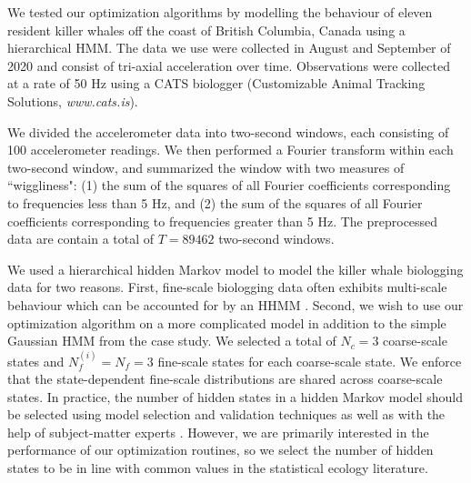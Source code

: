 
We tested our optimization algorithms by modelling the behaviour of eleven resident killer whales off the coast of British Columbia, Canada using a hierarchical HMM. The data we use were collected in August and September of 2020 and consist of tri-axial acceleration over time. Observations were collected at a rate of 50 Hz using a CATS biologger (Customizable Animal Tracking Solutions, {\em{www.cats.is}}).


We divided the accelerometer data into two-second windows, each consisting of 100 accelerometer readings. We then performed a Fourier transform within each two-second window, and summarized the window with two measures of ``wiggliness":
(1) the sum of the squares of all Fourier coefficients corresponding to frequencies less than 5 Hz, and (2) the sum of the squares of all Fourier coefficients corresponding to frequencies greater than 5 Hz. The preprocessed data are contain a total of $T=89462$ two-second windows.

We used a hierarchical hidden Markov model \citep{Barajas:2017} to model the killer whale biologging data for two reasons. First, fine-scale biologging data often exhibits multi-scale behaviour which can be accounted for by an HHMM \citep{Sidrow:2021}. Second, we wish to use our optimization algorithm on a more complicated model in addition to the simple Gaussian HMM from the case study. We selected a total of $N_c = 3$ coarse-scale states and $N_f^{(i)} = N_f = 3$ fine-scale states for each coarse-scale state. We enforce that the state-dependent fine-scale distributions are shared across coarse-scale states. In practice, the number of hidden states in a hidden Markov model should be selected using model selection and validation techniques as well as with the help of subject-matter experts \citep{Pohle:2017}. However, we are primarily interested in the performance of our optimization routines, so we select the number of hidden states to be in line with common values in the statistical ecology literature. 


